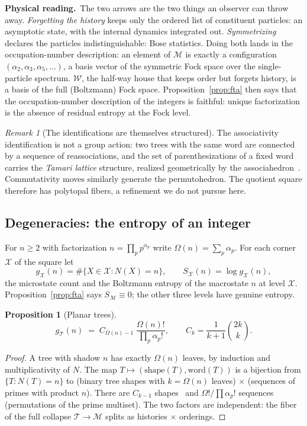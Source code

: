 \documentclass[11pt]{article}
\newcommand{\cT}{\mathcal{T}}   %
\newcommand{\cW}{\mathcal{W}}   %
\newcommand{\cM}{\mathcal{M}}   %
\newcommand{\physread}{\medskip\noindent\textbf{Physical reading.}\ }
\numberwithin{equation}{section}
\theoremstyle{plain}
\newtheorem{proposition}[theorem]{Proposition}
\theoremstyle{definition}
\theoremstyle{remark}
\newtheorem{remark}[theorem]{Remark}
\begin{document}
\physread The two arrows are the two things an observer can throw away.
\emph{Forgetting the history} keeps only the ordered list of constituent particles:
an asymptotic state, with the internal dynamics integrated out.
\emph{Symmetrizing} declares the particles indistinguishable: Bose
statistics. Doing both lands in the occupation-number description: an element of
$\cM$ is exactly a configuration $(\alpha_2, \alpha_3, \alpha_5, \dots)$, a basis
vector of the symmetric Fock space over the single-particle spectrum. $\cW$, the
half-way house that keeps order but forgets history, is a basis of the full
(Boltzmann) Fock space. Proposition~\ref{prop:fta} then says that the
occupation-number description of the integers is faithful: unique factorization is
the absence of residual entropy at the Fock level.

\begin{remark}[The identifications are themselves structured]
The associativity identification is not a group action: two trees with the same word
are connected by a sequence of reassociations, and the set of parenthesizations of a
fixed word carries the \emph{Tamari lattice} structure, realized geometrically by the
associahedron~\cite{tamari}. Commutativity moves similarly generate the permutohedron.
The quotient square therefore has polytopal fibers, a refinement we do not pursue
here.
\end{remark}

\subsection{Degeneracies: the entropy of an integer}

For $n \ge 2$ with factorization $n = \prod_p p^{\alpha_p}$ write
$\Omega(n) = \sum_p \alpha_p$. For each corner $\mathcal{X}$ of the square let
\[
g_{\mathcal X}(n) = \#\{X \in \mathcal{X} : N(X) = n\},
\qquad
S_{\mathcal X}(n) = \log g_{\mathcal X}(n),
\]
the microstate count and the Boltzmann entropy of the macrostate $n$ at level
$\mathcal X$. Proposition~\ref{prop:fta} says $S_\cM \equiv 0$; the other three levels
have genuine entropy.

\begin{proposition}[Planar trees]\label{prop:gT}
\[
g_\cT(n) \;=\; C_{\Omega(n)-1}\;\frac{\Omega(n)!}{\prod_p \alpha_p!},
\qquad C_k = \frac{1}{k+1}\binom{2k}{k}.
\]
\end{proposition}

\begin{proof}
A tree with shadow $n$ has exactly $\Omega(n)$ leaves, by induction and
multiplicativity of $N$. The map $T \mapsto (\text{shape}(T), \mathrm{word}(T))$ is a
bijection from $\{T : N(T)=n\}$ to (binary tree shapes with $k=\Omega(n)$ leaves)
$\times$ (sequences of primes with product $n$). There are $C_{k-1}$
shapes~\cite{stanley} and $\Omega!/\prod \alpha_p!$ sequences (permutations of the
prime multiset). The two factors are independent: the fiber of the full collapse
$\cT \to \cM$ splits as histories $\times$ orderings.
\end{proof}
\end{document}
